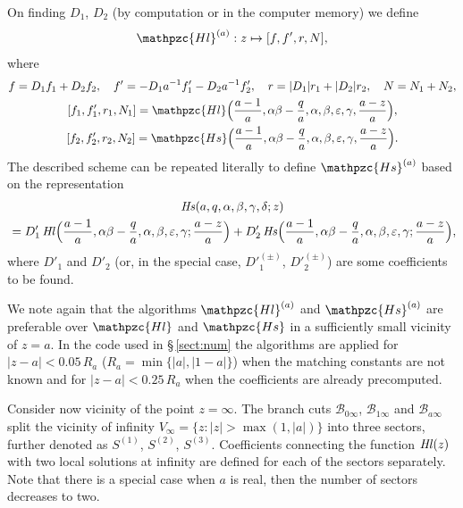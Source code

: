 \documentclass[11pt]{article}
\newcommand{\MF}[1]{\mathop{#1}\nolimits}
\newcommand{\SectInf}{S}%
\newcommand{\BCzero}{\mathscr{B}_{0\infty}}%
\newcommand{\BCone}{\mathscr{B}_{1\infty}}%
\newcommand{\BCa}{\mathscr{B}_{a\infty}}
\def\HeunL{\MF{\textit{Hl\/}}}%
\def\HeunS{\MF{\textit{Hs\/}}}%
\def\psHeunLfin{\mathpzc{Hl}}%
\def\psHeunSfin{\mathpzc{Hs}}%
\def\psHeunLneara{\mathpzc{Hl}^{(a)}}%
\def\psHeunSneara{\mathpzc{Hs}^{(a)}}%
\begin{document}
On finding $D_1$, $D_2$ (by computation or in the computer memory) we define
\begin{equation*}
 \psHeunLneara: z\mapsto [f,f',r,N],
\end{equation*}
where 
\begin{gather*}
 f=D_1 f_1 + D_2 f_2,\quad 
 f'=-D_1 a^{-1}f'_1 - D_2a^{-1}f'_2,\quad
 r = |D_1|r_1 + |D_2|r_2,\quad
 N = N_1 + N_2,\\
 [f_1,f'_1,r_1,N_1]=\psHeunLfin\Bigl(\frac{a-1}{a},\alpha\beta-\frac{q}{a},\alpha,\beta,\varepsilon,\gamma,\frac{a-z}{a}\Bigr),\\
 [f_2,f'_2,r_2,N_2]=\psHeunSfin\Bigl(\frac{a-1}{a},\alpha\beta-\frac{q}{a},\alpha,\beta,\varepsilon,\gamma,\frac{a-z}{a}\Bigr).
\end{gather*}
The described scheme can be repeated literally to define $\psHeunSneara$ based
on the representation
\begin{multline*}
\HeunS(a,q,\alpha,\beta,\gamma,\delta;z)\\{} = D'_1
 \HeunL\Bigl(\frac{a-1}{a},\alpha\beta-\frac{q}{a},
 \alpha,\beta,\varepsilon,\gamma;\frac{a-z}{a}\Bigr)
 +D'_2\HeunS\Bigl(\frac{a-1}{a},\alpha\beta-\frac{q}{a},\alpha,\beta,\varepsilon,\gamma;\frac{a-z}{a}\Bigr),
\end{multline*}
where $D'_1$ and $D'_2$  (or, in the special case, ${D'}^{(\pm)}_1$,
${D'}^{(\pm)}_2$) are some coefficients to be found.

We note again that the algorithms $\psHeunLneara$ and $\psHeunSneara$ are
preferable over $\psHeunLfin$ and $\psHeunSfin$ in a sufficiently small vicinity
of $z=a$. In the code used in \S\,\ref{sect:num} the algorithms are applied for
$|z-a|<0.05\,R_a$ ($R_a=\min\{|a|,|1-a|\}$) when the matching constants are not
known and for $|z-a|<0.25\,R_a$ when the coefficients are already precomputed.

Consider now vicinity of the point $z=\infty$. The branch cuts $\BCzero$,
$\BCone$ and $\BCa$ split the vicinity of infinity
$V_\infty=\{z:|z|>\max(1,|a|)\}$ into three sectors, further denoted as
$\SectInf^{(1)}$, $\SectInf^{(2)}$, $\SectInf^{(3)}$. Coefficients connecting
the function $\HeunL(z)$ with two local solutions at infinity are defined for
each of the sectors separately. Note that there is a special case when $a$ is
real, then the number of sectors decreases to two.
\end{document}
